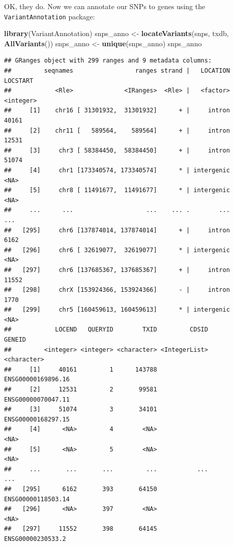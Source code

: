 \documentclass[9pt,a4paper,]{extarticle}
\newenvironment{Shaded}{\begin{snugshade}}{\end{snugshade}}
\newcommand{\KeywordTok}[1]{\textcolor[rgb]{0.13,0.29,0.53}{\textbf{#1}}}
\newcommand{\StringTok}[1]{\textcolor[rgb]{0.31,0.60,0.02}{#1}}
\newcommand{\NormalTok}[1]{#1}
\begin{document}
OK, they do.
Now we can annotate our SNPs to genes using the \texttt{VariantAnnotation} \citep{Obenchain2014} package:

\begin{Shaded}
\begin{Highlighting}[]
\KeywordTok{library}\NormalTok{(VariantAnnotation)}
\NormalTok{snps_anno <-}\StringTok{ }\KeywordTok{locateVariants}\NormalTok{(snps, txdb, }\KeywordTok{AllVariants}\NormalTok{())}
\NormalTok{snps_anno <-}\StringTok{ }\KeywordTok{unique}\NormalTok{(snps_anno)}
\NormalTok{snps_anno}
\end{Highlighting}
\end{Shaded}

\begin{verbatim}
## GRanges object with 299 ranges and 9 metadata columns:
##         seqnames                 ranges strand |   LOCATION  LOCSTART
##            <Rle>              <IRanges>  <Rle> |   <factor> <integer>
##     [1]    chr16 [ 31301932,  31301932]      + |     intron     40161
##     [2]    chr11 [   589564,    589564]      + |     intron     12531
##     [3]     chr3 [ 58384450,  58384450]      + |     intron     51074
##     [4]     chr1 [173340574, 173340574]      * | intergenic      <NA>
##     [5]     chr8 [ 11491677,  11491677]      * | intergenic      <NA>
##     ...      ...                    ...    ... .        ...       ...
##   [295]     chr6 [137874014, 137874014]      + |     intron      6162
##   [296]     chr6 [ 32619077,  32619077]      * | intergenic      <NA>
##   [297]     chr6 [137685367, 137685367]      + |     intron     11552
##   [298]     chrX [153924366, 153924366]      - |     intron      1770
##   [299]     chr5 [160459613, 160459613]      * | intergenic      <NA>
##            LOCEND   QUERYID        TXID         CDSID             GENEID
##         <integer> <integer> <character> <IntegerList>        <character>
##     [1]     40161         1      143788               ENSG00000169896.16
##     [2]     12531         2       99581               ENSG00000070047.11
##     [3]     51074         3       34101               ENSG00000168297.15
##     [4]      <NA>         4        <NA>                             <NA>
##     [5]      <NA>         5        <NA>                             <NA>
##     ...       ...       ...         ...           ...                ...
##   [295]      6162       393       64150               ENSG00000118503.14
##   [296]      <NA>       397        <NA>                             <NA>
##   [297]     11552       398       64145                ENSG00000230533.2

\end{verbatim}
\end{document}
